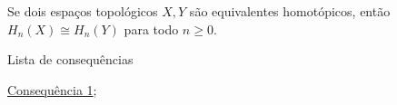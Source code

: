 \begin{corol}
    Se dois espaços topológicos $X,Y$ são equivalentes homotópicos, então $H_n(X)\cong H_n (Y)$ para todo $n\ge 0$. 
\end{corol}

\begin{titlemize}{Lista de consequências}
	\item \hyperref[consequencia1]{Consequência 1};\\ %
\end{titlemize}
